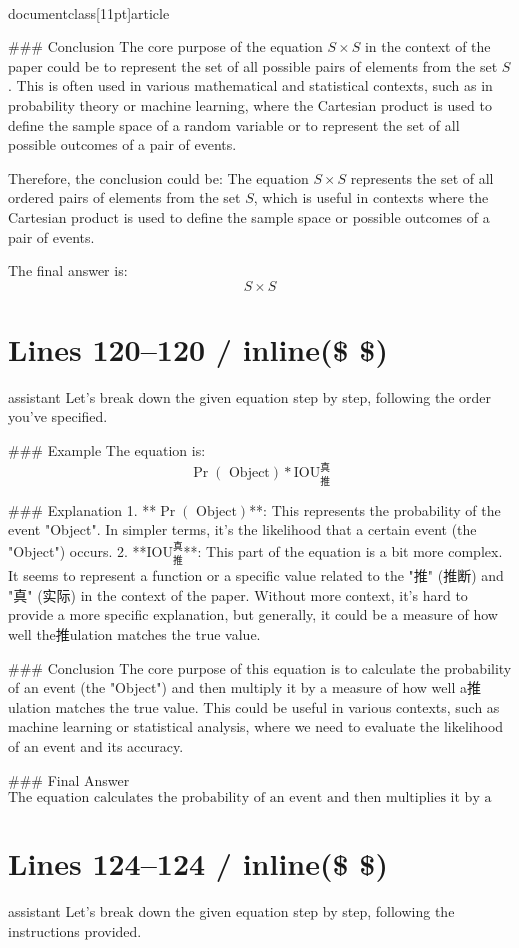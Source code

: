\\documentclass[11pt]{article}
\begin{document}
### Conclusion
The core purpose of the equation \( S \times S \) in the context of the paper could be to represent the set of all possible pairs of elements from the set \( S \). This is often used in various mathematical and statistical contexts, such as in probability theory or machine learning, where the Cartesian product is used to define the sample space of a random variable or to represent the set of all possible outcomes of a pair of events.

Therefore, the conclusion could be:
The equation \( S \times S \) represents the set of all ordered pairs of elements from the set \( S \), which is useful in contexts where the Cartesian product is used to define the sample space or possible outcomes of a pair of events.

The final answer is:
\[
\boxed{S \times S}
\]


\section*{Lines 120–120 / inline(\$ \$) }
assistant
Let's break down the given equation step by step, following the order you've specified.

### Example
The equation is:
\[
\Pr(\textrm{ Object}) * \textrm{IOU}_{\textrm{推}}^{\textrm{真}}
\]

### Explanation
1. **\(\Pr(\textrm{ Object})\)**: This represents the probability of the event "Object". In simpler terms, it's the likelihood that a certain event (the "Object") occurs.
2. **\(\textrm{IOU}_{\textrm{推}}^{\textrm{真}}\)**: This part of the equation is a bit more complex. It seems to represent a function or a specific value related to the "推" (推断) and "真" (实际) in the context of the paper. Without more context, it's hard to provide a more specific explanation, but generally, it could be a measure of how well the推ulation matches the true value.

### Conclusion
The core purpose of this equation is to calculate the probability of an event (the "Object") and then multiply it by a measure of how well a推ulation matches the true value. This could be useful in various contexts, such as machine learning or statistical analysis, where we need to evaluate the likelihood of an event and its accuracy.

### Final Answer
\[
\boxed{\text{The equation calculates the probability of an event and then multiplies it by a measure of how well a推ulation matches the true value.}}
\]


\section*{Lines 124–124 / inline(\$ \$) }
assistant
Let's break down the given equation step by step, following the instructions provided.
\end{document}
